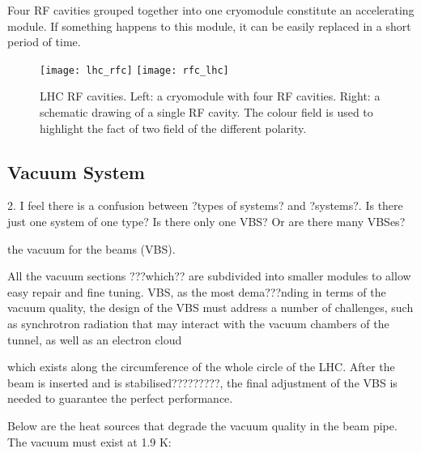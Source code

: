 Four RF cavities grouped together into one cryomodule constitute an accelerating module. If something happens to this module, it can be easily replaced in a short period of time. 


\begin{figure}[H]
\centering
\texttt{[image: lhc\_rfc]}
\texttt{[image: rfc\_lhc]}
\caption[RF cavities module.]{LHC RF cavities. Left: a cryomodule with four RF cavities. Right: a schematic drawing of a single RF cavity. The colour field is used to highlight the fact of two field of the different polarity. }
\label{lhc_rfc}
\end{figure}


\subsection{Vacuum System}\label{sec:vacuum}


 2. I feel there is a confusion between ?types of systems? and ?systems?. Is there just one system of one type? Is there only one VBS? Or are there many VBSes?
 
 
the vacuum for the beams (VBS). 

%

All the vacuum sections ???which?? are subdivided into smaller modules to allow easy repair and fine tuning. 
VBS, as the most dema???nding in terms of the vacuum quality, the design of the VBS must address a number of challenges, such as synchrotron radiation that may interact with the vacuum chambers of the tunnel, as well as an electron cloud 


 which exists along the circumference of the whole circle of the LHC. After the beam is inserted and is stabilised?????????, the final adjustment of the VBS is needed to guarantee the perfect performance.

Below are the heat sources that degrade the vacuum quality in the beam pipe. The vacuum must exist at 1.9 K:

